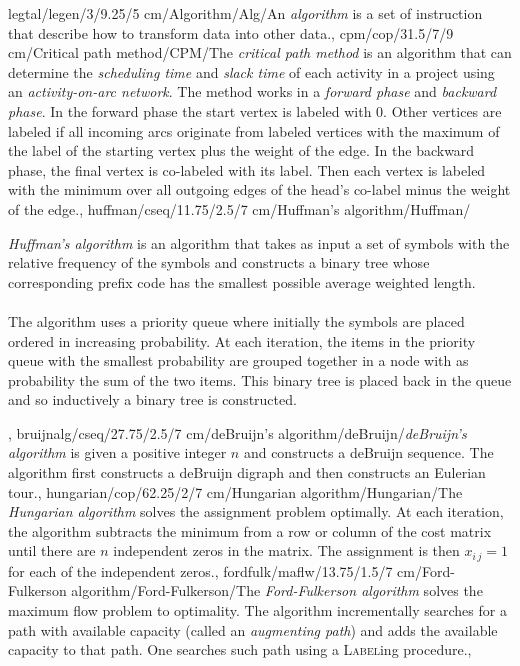 legtal/legen/3/9.25/5 cm/Algorithm/Alg/{An \emph{algorithm} is a set of instruction that describe how to transform data into other data.},
cpm/cop/31.5/7/9 cm/{Critical path method}/{CPM}/{The \emph{critical path method} is an algorithm that can determine the \emph{scheduling time} and \emph{slack time} of each activity in a project using an \emph{activity-on-arc network}. The method works in a \emph{forward phase} and \emph{backward phase}. In the forward phase the start vertex is labeled with $0$. Other vertices are labeled if all incoming arcs originate from labeled vertices with the maximum of the label of the starting vertex plus the weight of the edge. In the backward phase, the final vertex is co-labeled with its label. Then each vertex is labeled with the minimum over all outgoing edges of the head's co-label minus the weight of the edge.},
huffman/cseq/11.75/2.5/7 cm/{Huffman's algorithm}/{Huffman}/{\emph{Huffman's algorithm} is an algorithm that takes as input a set of symbols with the relative frequency of the symbols and constructs a binary tree whose corresponding prefix code has the smallest possible average weighted length.\paragraph{}The algorithm uses a priority queue where initially the symbols are placed ordered in increasing probability. At each iteration, the items in the priority queue with the smallest probability are grouped together in a node with as probability the sum of the two items. This binary tree is placed back in the queue and so inductively a binary tree is constructed.},
bruijnalg/cseq/27.75/2.5/7 cm/{deBruijn's algorithm}/{deBruijn}/{\emph{deBruijn's algorithm} is given a positive integer $n$ and constructs a deBruijn sequence. The algorithm first constructs a deBruijn digraph and then constructs an Eulerian tour.},
hungarian/cop/62.25/2/7 cm/{Hungarian algorithm}/{Hungarian}/{The \emph{Hungarian algorithm} solves the assignment problem optimally. At each iteration, the algorithm subtracts the minimum from a row or column of the cost matrix until there are $n$ independent zeros in the matrix. The assignment is then $x_{i\,j}=1$ for each of the independent zeros.},
fordfulk/maflw/13.75/1.5/7 cm/{Ford-Fulkerson algorithm}/{Ford-Fulkerson}/{The \emph{Ford-Fulkerson algorithm} solves the maximum flow problem to optimality. The algorithm incrementally searches for a path with available capacity (called an \emph{augmenting path}) and adds the available capacity to that path. One searches such path using a \textsc{Label}ing procedure.},

